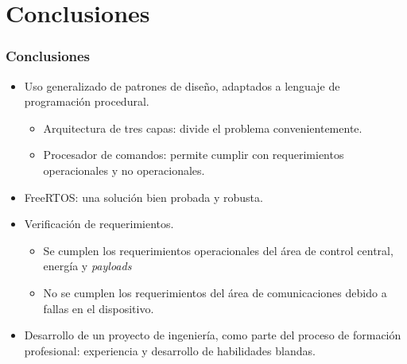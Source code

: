 \documentclass[xcolor=dvipsnames]{beamer}
\begin{document}
    \begin{frame}
        \centering \Large {}
        
    \end{frame}

    \section{Conclusiones}
    \begin{frame}
        \frametitle{Conclusiones}
        \begin{itemize}
            \item Uso generalizado de patrones de diseño, adaptados a lenguaje de programación procedural.
            \begin{itemize}
                \item Arquitectura de tres capas: divide el problema convenientemente.
                \item Procesador de comandos: permite cumplir con requerimientos operacionales y no operacionales.
            \end{itemize}
            
            \item FreeRTOS: una solución bien probada y robusta.
            \item Verificación de requerimientos.
            \begin{itemize}
                \item Se cumplen los requerimientos operacionales del área de control central, energía y \textit{payloads}
                \item No se cumplen los requerimientos del área de comunicaciones debido a fallas en el dispositivo.
            \end{itemize}
            \item Desarrollo de un proyecto de ingeniería, como parte del proceso de formación profesional: experiencia y desarrollo de habilidades blandas.

        \end{itemize}

    \end{frame}
    
\end{document}
